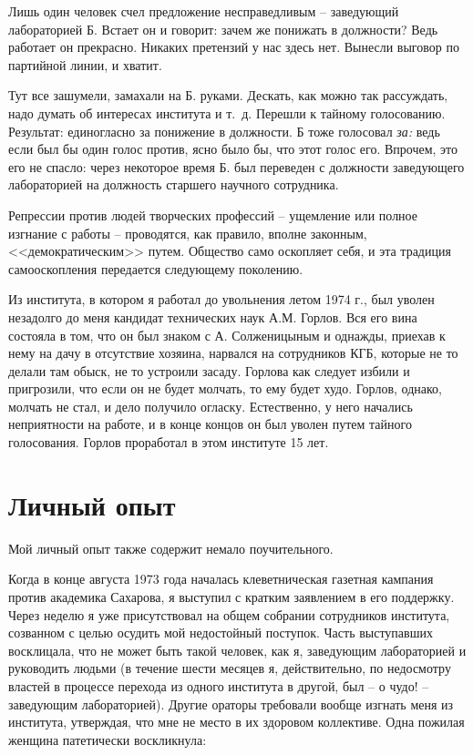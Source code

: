 \documentclass{book}
\begin{document}
Лишь один человек счел предложение несправедливым -- заведующий лабораторией Б. Встает он и говорит: зачем же понижать в должности? Ведь работает он прекрасно. Никаких претензий у нас здесь нет. Вынесли выговор по партийной линии, и хватит.

Тут все зашумели, замахали на Б. руками. Дескать, как можно так рассуждать, надо думать об интересах института и т.~д. Перешли к тайному голосованию. Результат: единогласно за понижение в должности. Б тоже голосовал \textit{за:}  ведь если был бы один голос против, ясно было бы, что этот голос его. Впрочем, это его не спасло: через некоторое время Б. был переведен с должности заведующего лабораторией на должность старшего научного сотрудника.

Репрессии против людей творческих профессий -- ущемление или полное изгнание с работы -- проводятся, как правило, вполне законным, <<демократическим>> путем. Общество само оскопляет себя, и эта традиция самооскопления передается следующему поколению.

Из института, в котором я работал до увольнения летом 1974 г., был уволен незадолго до меня кандидат технических наук А.М. Горлов. Вся его вина состояла в том, что он был знаком с А. Солженицыным и однажды, приехав к нему на дачу в отсутствие хозяина, нарвался на сотрудников КГБ, которые не то делали там обыск, не то устроили засаду. Горлова как следует избили и пригрозили, что если он не будет молчать, то ему будет худо. Горлов, однако, молчать не стал, и дело получило огласку. Естественно, у него начались неприятности на работе, и в конце концов он был уволен путем тайного голосования. Горлов проработал в этом институте 15 лет.



\section{Личный опыт}

Мой личный опыт также содержит немало поучительного.

Когда в конце августа 1973 года началась клеветническая газетная кампания против академика Сахарова, я выступил с кратким заявлением в его поддержку. Через неделю я уже присутствовал на общем собрании сотрудников института, созванном с целью осудить мой недостойный поступок. Часть выступавших восклицала, что не может быть такой человек, как я, заведующим лабораторией и руководить людьми (в течение шести месяцев я, действительно, по недосмотру властей в процессе перехода из одного института в другой, был -- о чудо! -- заведующим лабораторией). Другие ораторы требовали вообще изгнать меня из института, утверждая, что мне не место в их здоровом коллективе. Одна пожилая женщина патетически воскликнула:
\end{document}
